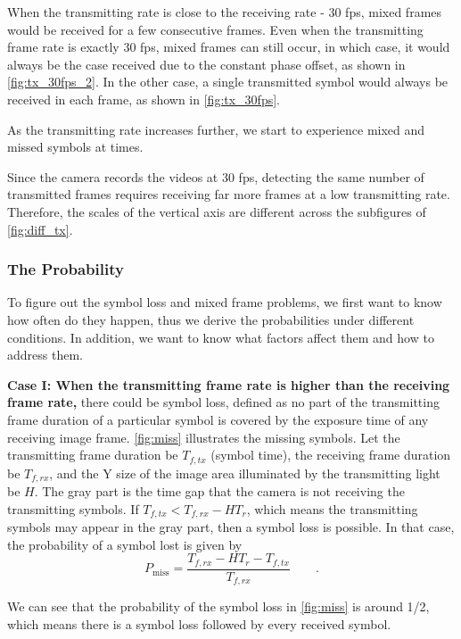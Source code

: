 When the transmitting rate is close to the receiving rate - 30 fps, mixed frames would be received for a few consecutive frames. Even when the transmitting frame rate is exactly 30 fps, mixed frames can still occur, in which case, it would always be the case received due to the constant phase offset, as shown in \autoref{fig:tx_30fps_2}. In the other case, a single transmitted symbol would always be received in each frame, as shown in \autoref{fig:tx_30fps}.

As the transmitting rate increases further, we start to experience mixed and missed symbols at times.

Since the camera records the videos at 30 fps, detecting the same number of transmitted frames requires receiving far more frames at a low transmitting rate. Therefore, the scales of the vertical axis are different across the subfigures of \autoref{fig:diff_tx}.

\subsubsection{The Probability}
\label{sec:unsync}
To figure out the symbol loss and mixed frame problems, we first want to know how often do they happen, thus we derive the probabilities under different conditions. In addition, we want to know what factors affect them and how to address them.

\textbf{Case I: When the transmitting frame rate is higher than the receiving frame rate,}
there could be symbol loss, defined as no part of the transmitting frame duration of a particular symbol is covered by the exposure time of any receiving image frame. 
\autoref{fig:miss} illustrates the missing symbols. 
Let the transmitting frame duration be $T_{f,tx}$ (symbol time), the receiving frame duration be $T_{f,rx}$, and the Y size of the image area illuminated by the transmitting light be $H$. The gray part is the time gap that the camera is not receiving the transmitting symbols. If $T_{f,tx} < T_{f,rx} - H T_r$, which means the transmitting symbols may appear in the gray part, then a symbol loss is possible. In that case, the probability of a symbol lost is given by
\begin{equation}
	P_{\operatorname{miss}}=\frac{T_{f,rx} - H T_r - T_{f,tx} }{T_{f,rx}} \qquad \textrm{.}
\end{equation}

We can see that the probability of the symbol loss in \autoref{fig:miss} is around 1/2, which means there is a symbol loss followed by every received symbol.


